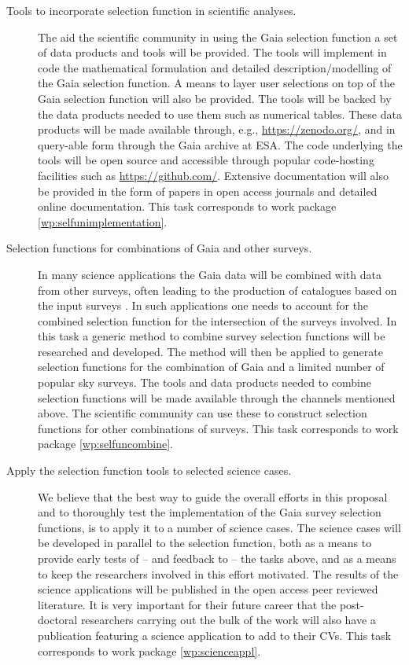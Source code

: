 \begin{description}
    \item[Tools to incorporate selection function in scientific analyses.] The aid the scientific community in using the Gaia selection function a set of data products and tools will be provided. The tools will implement in code the mathematical formulation and detailed description/modelling of the Gaia selection function. A means to layer user selections on top of the Gaia selection function will also be provided. The tools will be backed by the data products needed to use them such as numerical tables. These data products will be made available through, e.g., \url{https://zenodo.org/}, and in query-able form through the Gaia archive at ESA. The code underlying the tools will be open source and accessible through popular code-hosting facilities such as \url{https://github.com/}. Extensive documentation will also be provided in the form of papers in open access journals and detailed online documentation. This task corresponds to work package \ref{wp:selfunimplementation}.
    \item[Selection functions for combinations of Gaia and other surveys.] In many science applications the Gaia data will be combined with data from other surveys, often leading to the production of catalogues based on the input surveys \citep[see for example][]{2019A&A...628A..94A}. In such applications one needs to account for the combined selection function for the intersection of the surveys involved. In this task a generic method to combine survey selection functions will be researched and developed. The method will then be applied to generate selection functions for the combination of Gaia and a limited number of popular sky surveys. The tools and data products needed to combine selection functions will be made available through the channels mentioned above. The scientific community can use these to construct selection functions for other combinations of surveys. This task corresponds to work package \ref{wp:selfuncombine}.
    \item[Apply the selection function tools to selected science cases.] We believe that the best way to guide the overall efforts in this proposal and to thoroughly test the implementation of the Gaia survey selection functions, is to apply it to a number of science cases. The science cases will be developed in parallel to the selection function, both as a means to provide early tests of -- and feedback to -- the tasks above, and as a means to keep the researchers involved in this effort motivated. The results of the science applications will be published in the open access peer reviewed literature. It is very important for their future career that the post-doctoral researchers carrying out the bulk of the work will also have a publication featuring a science application to add to their CVs. This task corresponds to work package \ref{wp:scienceappl}.
\end{description}

